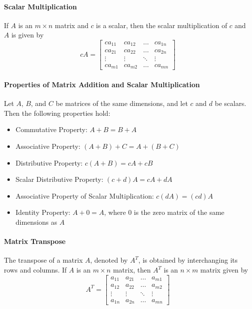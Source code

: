 \paragraph*{Scalar Multiplication} If $A$ is an $m \times n$ matrix and $c$ is a scalar, then the scalar multiplication of $c$ and $A$ is given by
\[cA = \begin{bmatrix}
    ca_{11} & ca_{12} & \ldots & ca_{1n} \\
    ca_{21} & ca_{22} & \ldots & ca_{2n} \\
    \vdots & \vdots & \ddots & \vdots \\
    ca_{m1} & ca_{m2} & \ldots & ca_{mn}
\end{bmatrix}\]

\paragraph*{Properties of Matrix Addition and Scalar Multiplication}
Let $A$, $B$, and $C$ be matrices of the same dimensions, and let $c$ and $d$ be scalars. Then the following properties hold:
\begin{itemize}
    \item Commutative Property: $A + B = B + A$
    \item Associative Property: $(A + B) + C = A + (B + C)$
    \item Distributive Property: $c(A + B) = cA + cB$
    \item Scalar Distributive Property: $(c + d)A = cA + dA$
    \item Associative Property of Scalar Multiplication: $c(dA) = (cd)A$
    \item Identity Property: $A + 0 = A$, where $0$ is the zero matrix of the same dimensions as $A$
\end{itemize}

\paragraph*{Matrix Transpose} The transpose of a matrix $A$, denoted by $A^T$, is obtained by interchanging its rows and columns. If $A$ is an $m \times n$ matrix, then $A^T$ is an $n \times m$ matrix given by
\[A^T = \begin{bmatrix}
    a_{11} & a_{21} & \ldots & a_{m1} \\
    a_{12} & a_{22} & \ldots & a_{m2} \\
    \vdots & \vdots & \ddots & \vdots \\
    a_{1n} & a_{2n} & \ldots & a_{mn}
\end{bmatrix}\]

